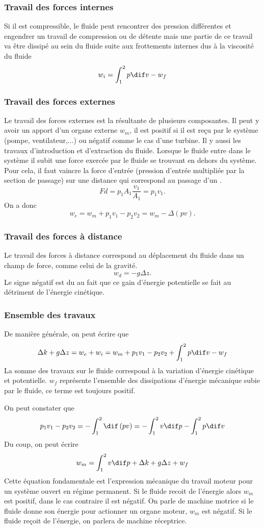 \subsubsection{Travail des forces internes}
Si il est compressible, le fluide peut rencontrer des pression différentes et
engendrer un travail de compression ou de détente mais une partie
de ce travail va être dissipé au sein du fluide suite aux
frottements internes dus à la viscosité du fluide
\[  w_i = \int_1^2 p \dif v - w_f \]

\subsubsection{Travail des forces externes}
Le travail des forces externes est la résultante de plusieurs composantes.
Il peut y avoir un apport d'un organe externe $w_m$,
il est positif si il est reçu par le système (pompe, ventilateur,...) ou
négatif comme le cas d'une turbine.
Il y aussi les travaux d'introduction et d'extraction du fluide.
Lorsque le fluide  entre dans le système il subit une force exercée
par le fluide se trouvant en dehors du système.
Pour cela, il faut vaincre la force d'entrée
(pression d'entrée multipliée par la section de passage)
sur une distance qui correspond au passage d'un \kilogram.
\[ Fd = p_1A_1\frac{v_1}{A_1} = p_1v_1. \]
On a donc
\[ w_e = w_m + p_1v_1 - p_2v_2 = w_m - \Delta(pv). \]

\subsubsection{Travail des forces à distance}
Le travail des forces à distance correspond au déplacement du fluide
dans un champ de force, comme celui de la gravité.
\[  w_d = -g \Delta z. \]
Le signe négatif est du au fait que ce gain d'énergie potentielle
se fait au détriment de l'énergie cinétique.

\subsubsection{Ensemble des travaux}
De manière générale, on peut écrire que
\[ \Delta k + g\Delta z = w_e + w_i =
w_m + p_1v_1 - p_2v_2 + \int_1^2 p \dif v - w_f \]
La somme des travaux sur le fluide correspond
à la variation d'énergie cinétique et potentielle.
$w_f$ représente l'ensemble des dissipations
d'énergie mécanique subie par le fluide, ce terme est toujours positif.

On peut constater que
\[  p_1v_1-p_2v_2 = -\int_1^2 \dif\left(pv\right) =
  -\int_1^2 v\dif p - \int_1^2 p\dif v \]
Du coup, on peut écrire
\[ w_m = \int_1^2v\dif p + \Delta k + g\Delta z + w_f \]
Cette équation fondamentale est l'expression mécanique
du travail moteur pour un système ouvert en régime permanent.
Si le fluide recoit de l'énergie alors $w_m$ est positif,
dans le cas contraire il est négatif.
On parle de machine motrice si le fluide donne son énergie
pour actionner un organe moteur, $w_m$ est négatif.
Si le fluide reçoit de l'énergie, on parlera de machine réceptrice.

